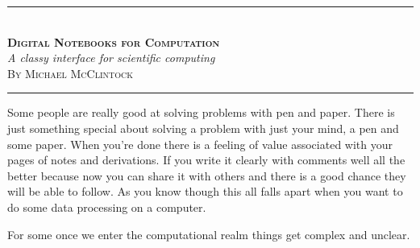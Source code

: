 \documentclass[10pt, a4paper]{article}  %
\begin{document}
\begin{center}
    \rule[0.5ex]{1\columnwidth}{1pt}
    \\[4mm]
    \textbf{\textsc{\Huge Digital Notebooks for Computation}}
    \\[6mm]
    \textit{\Large A classy interface for scientific computing}
    \\[6mm]
    \textsc{\large By Michael McClintock}
    \\[4mm]
    \rule[0.5ex]{1\columnwidth}{1pt}
\end{center}

\begin{multicols}{2}

Some people are really good at solving problems with pen and paper. There is
just something special about solving a problem with just your mind, a pen and
some paper. When you're done there is a feeling of value associated with your
pages of notes and derivations. If you write it clearly with comments well all
the better because now you can share it with others and there is a good chance
they will be able to follow. As you know though this all falls apart when you
want to do some data processing on a computer.

For some once we enter the computational realm things get complex and unclear.




\end{multicols}
\end{document}

